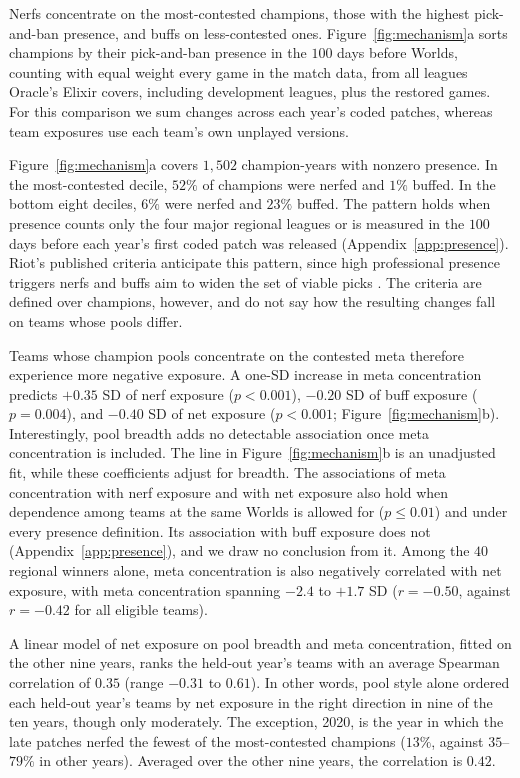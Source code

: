\documentclass[11pt]{article}
\begin{document}
Nerfs concentrate on the most-contested champions, those with the highest pick-and-ban presence, and buffs on less-contested ones. Figure~\ref{fig:mechanism}a sorts champions by their pick-and-ban presence in the $100$ days before Worlds, counting with equal weight every game in the match data, from all leagues Oracle's Elixir covers, including development leagues, plus the restored games. For this comparison we sum changes across each year's coded patches, whereas team exposures use each team's own unplayed versions.

Figure~\ref{fig:mechanism}a covers $1{,}502$ champion-years with nonzero presence. In the most-contested decile, $52\%$ of champions were nerfed and $1\%$ buffed. In the bottom eight deciles, $6\%$ were nerfed and $23\%$ buffed. The pattern holds when presence counts only the four major regional leagues or is measured in the $100$ days before each year's first coded patch was released (Appendix~\ref{app:presence}). Riot's published criteria anticipate this pattern, since high professional presence triggers nerfs and buffs aim to widen the set of viable picks \citep{riot2020proplay}. The criteria are defined over champions, however, and do not say how the resulting changes fall on teams whose pools differ.

Teams whose champion pools concentrate on the contested meta therefore experience more negative exposure. A one-SD increase in meta concentration predicts $+0.35$ SD of nerf exposure ($p < 0.001$), $-0.20$ SD of buff exposure ($p = 0.004$), and $-0.40$ SD of net exposure ($p < 0.001$; Figure~\ref{fig:mechanism}b). Interestingly, pool breadth adds no detectable association once meta concentration is included. The line in Figure~\ref{fig:mechanism}b is an unadjusted fit, while these coefficients adjust for breadth. The associations of meta concentration with nerf exposure and with net exposure also hold when dependence among teams at the same Worlds is allowed for ($p \leq 0.01$) and under every presence definition. Its association with buff exposure does not (Appendix~\ref{app:presence}), and we draw no conclusion from it. Among the $40$ regional winners alone, meta concentration is also negatively correlated with net exposure, with meta concentration spanning $-2.4$ to $+1.7$ SD ($r = -0.50$, against $r = -0.42$ for all eligible teams).

A linear model of net exposure on pool breadth and meta concentration, fitted on the other nine years, ranks the held-out year's teams with an average Spearman correlation of $0.35$ (range $-0.31$ to $0.61$). In other words, pool style alone ordered each held-out year's teams by net exposure in the right direction in nine of the ten years, though only moderately. The exception, 2020, is the year in which the late patches nerfed the fewest of the most-contested champions ($13\%$, against $35$--$79\%$ in other years). Averaged over the other nine years, the correlation is $0.42$.
\end{document}
